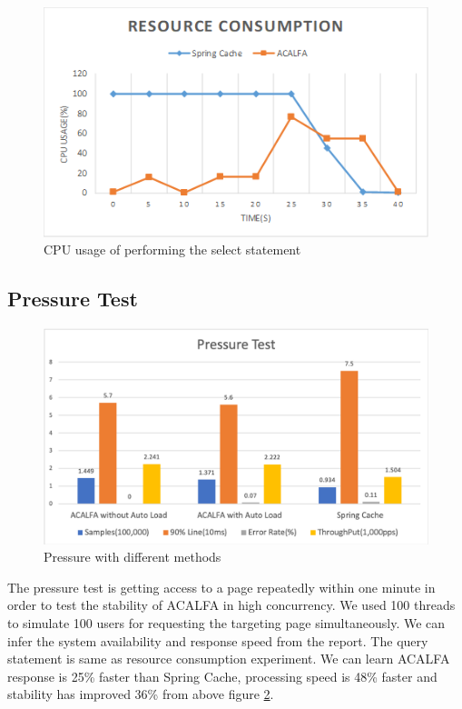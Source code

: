 \documentclass{singlecol-new}
\theoremstyle{TH}{
\newtheorem{lemma}{Lemma}
\newtheorem{theorem}[lemma]{Theorem}
\newtheorem{corrolary}[lemma]{Corrolary}
\newtheorem{conjecture}[lemma]{Conjecture}
\newtheorem{proposition}[lemma]{Proposition}
\newtheorem{claim}[lemma]{Claim}
\newtheorem{stheorem}[lemma]{Wrong Theorem}
}
\theoremstyle{THrm}{
\newtheorem{definition}{Definition}[section]
\newtheorem{question}{Question}[section]
\newtheorem{remark}{Remark}
\newtheorem{scheme}{Scheme}
}
\theoremstyle{THhit}{
\newtheorem{case}{Case}[section]
}
\begin{document}
\begin{figure} [htb]
    \centering
    \includegraphics[width=1\linewidth]{img/resource.png}
    \caption{CPU usage of performing the select statement}
    \label{resource}
\end{figure}

\subsection{Pressure Test}

 \begin{figure}
     \centering
     \includegraphics[width=1\linewidth]{img/pressuretest.png}
     \caption{Pressure with different methods}
     \label{pressuretest}
 \end{figure}

 The pressure test is getting access to a page repeatedly within one minute in order to test the stability of ACALFA in high concurrency. We used 100 threads to simulate 100 users for requesting the targeting page simultaneously. We can infer the system availability and response speed from the report. The query statement is same as resource consumption experiment. We can learn ACALFA response is 25\% faster than Spring Cache, processing speed is 48\% faster and stability has improved 36\% from above figure \ref{pressuretest}.
\end{document}
